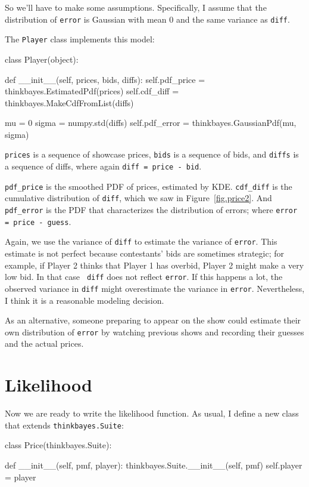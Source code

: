 \documentclass[12pt]{book}
\theoremstyle{exercise}
\begin{document}
So we'll have to make some assumptions.  Specifically, I
assume that the distribution of {\tt error} is Gaussian with mean 0
and the same variance as {\tt diff}.

The {\tt Player} class implements this model:

\begin{code}
class Player(object):

    def __init__(self, prices, bids, diffs):
        self.pdf_price = thinkbayes.EstimatedPdf(prices)
        self.cdf_diff = thinkbayes.MakeCdfFromList(diffs)

        mu = 0
        sigma = numpy.std(diffs)
        self.pdf_error = thinkbayes.GaussianPdf(mu, sigma)
\end{code}

{\tt prices} is a sequence of showcase prices, {\tt bids} is a
sequence of bids, and {\tt diffs} is a sequence of diffs, where
again {\tt diff = price - bid}.

\verb"pdf_price" is the smoothed PDF of prices, estimated by KDE.
\verb"cdf_diff" is the cumulative distribution of {\tt diff},
which we saw in Figure~\ref{fig.price2}.  And \verb"pdf_error"
is the PDF that characterizes the distribution of errors; where
{\tt error = price - guess}.

Again, we use the variance of {\tt diff} to estimate the variance of
{\tt error}.  This estimate is not perfect because contestants' bids
are sometimes strategic; for example, if Player 2 thinks that Player 1
has overbid, Player 2 might make a very low bid.  In that case {\tt
  diff} does not reflect {\tt error}.  If this happens a lot, the
observed variance in {\tt diff} might overestimate the variance in
{\tt error}.  Nevertheless, I think it is a reasonable modeling
decision.

As an alternative, someone preparing to appear on the show could
estimate their own distribution of {\tt error} by watching previous shows
and recording their guesses and the actual prices.


\section{Likelihood}

Now we are ready to write the likelihood function.  As usual,
I define a new class that extends {\tt thinkbayes.Suite}:

\begin{code}
class Price(thinkbayes.Suite):

    def __init__(self, pmf, player):
        thinkbayes.Suite.__init__(self, pmf)
        self.player = player
\end{code}
\end{document}
